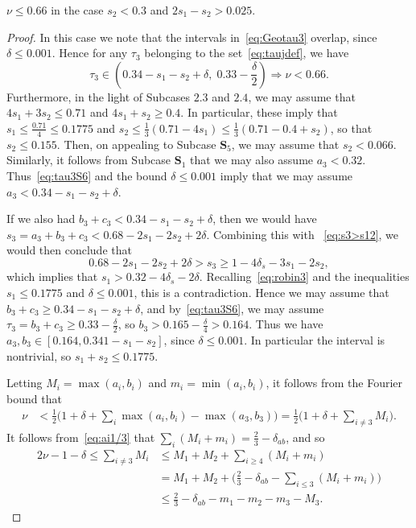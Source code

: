 \begin{lemma}\label{lem:Subcase2.6}
  \leanok
  $\nu \leq 0.66$ in the case $s_2<0.3$ and $2s_1-s_2>0.025$.
\end{lemma}
\begin{proof}
  In this case we note that the intervals in~\eqref{eq:Geotau3} overlap, since $\delta\leq 0.001$.
  Hence for any $\tau_3$ belonging to the set~\eqref{eq:taujdef}, we have
  \begin{equation}\label{eq:tau3S6}
    \tau_3\in
    \left(0.34-s_1-s_2+ \delta, \;
    0.33-\frac{\delta}{2}\right)
    \Longrightarrow
    \nu < 0.66.
  \end{equation}
  Furthermore, in the light of Subcases $\mathbf{2.3}$ and $\mathbf{2.4}$, we may assume that
  $4s_1+3s_2\leq 0.71$ and $4s_1+s_2\geq 0.4$. In particular, these imply
  that $s_1\leq \frac{0.71}{4}\leq 0.1775$ and
  $s_2 \leq \frac{1}{3}(0.71 - 4s_1) \leq \frac{1}{3}(0.71-0.4+s_2)$, so that $s_2\leq 0.155$.
  Then, on appealing to Subcase $\mathbf{S}_5$, we may assume that $s_2< 0.066$.
  Similarly, it follows from Subcase $\mathbf{S}_1$ that we may also assume $a_3<0.32$.
  Thus~\eqref{eq:tau3S6} and the bound $\delta\leq 0.001$ imply that we may assume $a_3< 0.34-s_1-s_2+ \delta$.

  If we also had $b_3+c_3<0.34-s_1-s_2+\delta$, then we would have $s_3 = a_3 + b_3 +c_3 < 0.68-2s_1-2s_2+2\delta$.
  Combining this with ~\eqref{eq:s3>s12}, we would then conclude that
  \[
    0.68-2s_1-2s_2+2\delta>
    s_3 \ge 1-4\delta_s-3s_1-2s_2,
  \]
  which implies that
  $s_1>0.32-4\delta_s-2\delta$.
  Recalling~\eqref{eq:robin3} and the inequalities
  $s_1\leq 0.1775$ and $\delta\leq 0.001$, this is a contradiction.
  Hence we may assume that $b_3+c_3\ge 0.34-s_1-s_2+ \delta$, and by~\eqref{eq:tau3S6}, we may assume $\tau_3=b_3+c_3\geq 0.33-\frac{\delta}{2}$, so $b_3>0.165-\frac{\delta}{4}> 0.164$. Thus we have $a_3,b_3\in [0.164, 0.341-s_1-s_2]$,
  since $\delta\leq 0.001$.
  In particular the interval is nontrivial, so $s_1+s_2\le 0.1775$.


  Letting $M_i = \max(a_i, b_i)$ and $m_i = \min(a_i, b_i)$, it follows from the Fourier bound that
  \begin{align*}
    \nu &< \frac{1}{2}\Big(1+\delta+\sum_{i}\max(a_i, b_i) - \max(a_3,b_3)\Big) = \frac{1}{2}\Big(1+\delta+\sum_{i\neq3}M_i\Big).
  \end{align*}
  It follows from~\eqref{eq:ai1/3} that
  $\sum_i (M_i+m_i)=\frac{2}{3}-\delta_{ab}$, and so
  \begin{align*}
    2\nu-1 -\delta\le \sum_{i\neq3}M_i
    &\le M_1+M_2 + \sum_{i\ge4}(M_i+m_i)\\
    &= M_1+M_2 + \Big(\frac{2}{3} - \delta_{ab} - \sum_{i\le3}(M_i+m_i)\Big)\\
    & \le \frac{2}{3} - \delta_{ab} - m_1 - m_2 - m_3 - M_3.
  \end{align*}


\end{proof}
